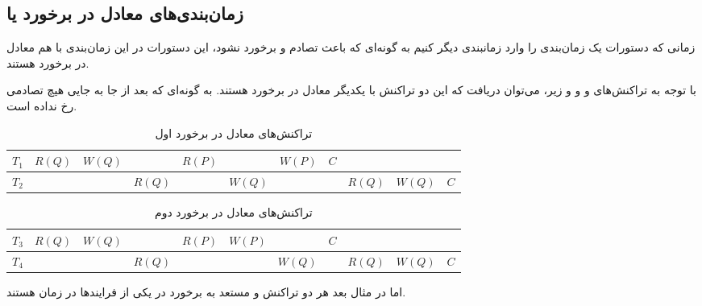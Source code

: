 \documentclass[a4paper]{article}
\begin{document}
\subsection{زمان‌بندی‌های معادل در برخورد یا }

زمانی که دستورات یک زمان‌بندی را وارد زمانبندی دیگر کنیم به گونه‌ای که باعث تصادم
و برخورد نشود، این دستورات در این زمان‌بندی با هم معادل در برخورد هستند.

با توجه به تراکنش‌های  و  و  و 
زیر، می‌توان دریافت که این دو تراکنش با یکدیگر معادل در برخورد هستند. به گونه‌ای
که بعد از جا به جایی هیچ تصادمی رخ نداده است.

\begin{LTR}
    \begin{table}[h]
        \centering
        \begin{RTL}
            \caption{تراکنش‌های معادل در برخورد اول}
        \end{RTL}
        \begin{tabular}{|c|c|c|c|c|c|c|c|c|c|c|}
            \hline
            $T_{1}$ & $R(Q)$ & $W(Q)$ & & $R(P)$ & & $W(P)$ & $C$ & & & \\ \hline
            $T_{2}$ & & & $R(Q)$ & & $W(Q)$ & &  & $R(Q)$ & $W(Q)$ & $C$ \\ \hline
        \end{tabular}
    \end{table}
\end{LTR}

\begin{LTR}
    \begin{table}[h]
        \centering
        \begin{RTL}
            \caption{تراکنش‌های معادل در برخورد دوم}
        \end{RTL}
        \begin{tabular}{|c|c|c|c|c|c|c|c|c|c|c|}
            \hline
            $T_{3}$ & $R(Q)$ & $W(Q)$ & & $R(P)$ & $W(P)$ & & $C$ & & & \\ \hline
            $T_{4}$ & & & $R(Q)$ & & & $W(Q)$ &  & $R(Q)$ & $W(Q)$ & $C$ \\ \hline
        \end{tabular}
    \end{table}
\end{LTR}

\newpage

اما در مثال بعد هر دو تراکنش  و  مستعد به برخورد در یکی
از فرایند‌ها در زمان هستند.
\end{document}
